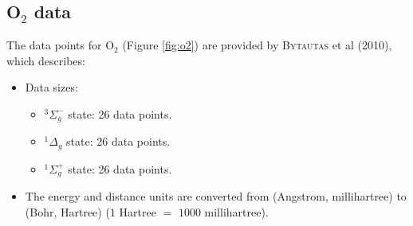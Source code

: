 \documentclass[12pt]{article}
\begin{document}
\subsection{O$_2$ data}
The data points for O$_2$ (Figure \ref{fig:o2}) are provided by \textsc{Bytautas} et al (2010)\cite{idx158}, which describes:
\begin{itemize}
    \item Data sizes:
    \begin{itemize}
        \item $^3\Sigma^-_g$ state: 26 data points.
        \item $^1\Delta_g$ state: 26 data points.
        \item $^1\Sigma^+_g$ state: 26 data points.
    \end{itemize}
    \item The energy and distance units are converted from (Angstrom, millihartree) to (Bohr, Hartree) ($1$ Hartree $=$ $1000$ millihartree).
\end{itemize}
\end{document}
